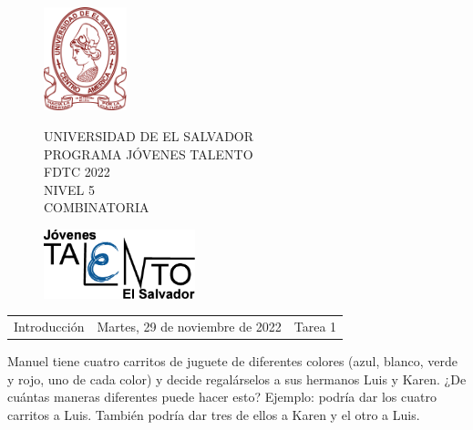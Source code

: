 \documentclass[12pt]{article}
\newcommand{\tema}{Introducción}
\newcommand{\fecha}{Martes, 29 de noviembre de 2022}
\newcommand{\sesion}{Tarea 1}
\begin{document}
\thispagestyle{empty}

\begin{figure}[h] 
	\begin{minipage}[b]{0.26\textwidth}
		\begin{center}
			\includegraphics[height=3cm]{Logos/UES.png}
			\par\end{center}
	\end{minipage} 
	\begin{minipage}[b]{0.46\textwidth}
		\begin{center}
			UNIVERSIDAD DE EL SALVADOR\\ [0.1cm]
			PROGRAMA JÓVENES TALENTO\\ [0.1cm]
	        FDTC 2022\\ [0.1cm]
                NIVEL 5\\ [0.1cm]
			COMBINATORIA 
			\par\end{center}
	\end{minipage} 
	\begin{minipage}[b]{0.05\textwidth}
		\begin{center}
			\includegraphics[height=2cm]{Logos/LOGO PJT.png}
			\par\end{center}
	\end{minipage}
\end{figure}

\begin{center}
    \begin{tabular}{p{4.5cm} p{7cm} p{4.5cm}}
        \tema & \centering\fecha & \hfill\sesion
    \end{tabular}
\end{center}

\begin{problema}
    Manuel tiene cuatro carritos de juguete de diferentes colores (azul, blanco, verde y rojo, uno de cada color) y decide regalárselos a sus hermanos Luis y Karen. ¿De cuántas maneras diferentes puede hacer esto? Ejemplo: podría dar los cuatro carritos a Luis. También podría dar tres de ellos a Karen y el otro a Luis.
\end{problema}
\end{document}
